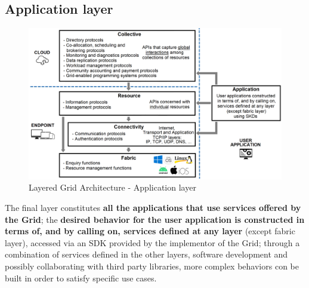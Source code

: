 \subsection{Application layer}
\begin{figure}[!ht]
    \centering
    \includegraphics[width=\linewidth]{document/chapters/chapter_2/images/application_layer.png}
    \caption{Layered Grid Architecture - Application layer}
    \label{fig:application_layer}
\end{figure}

\noindent The final layer constitutes \textbf{all the applications that use services offered by the Grid}; the \textbf{desired behavior for the user application is constructed in terms of, and by calling on, services defined at any layer} (except fabric layer), accessed via an SDK provided by the implementor of the Grid; through a combination of services defined in the other layers, software development and possibly collaborating with third party libraries, more complex behaviors con be built in order to satisfy specific use cases.

